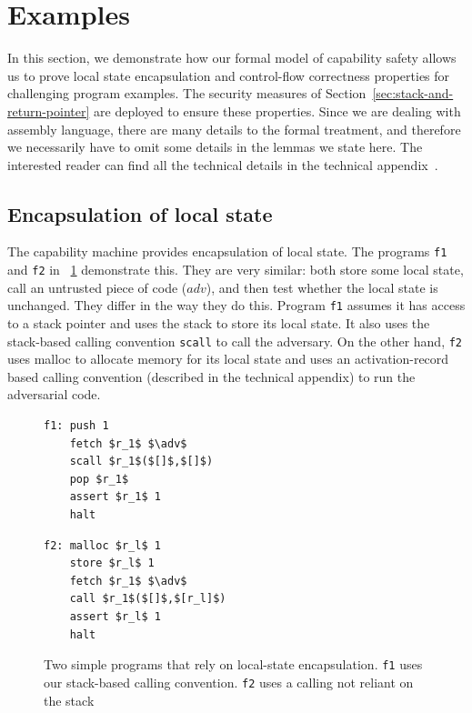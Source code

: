 \documentclass[compsoc,conference,letterpaper,fleqn]{IEEEtran}
\newcommand{\var}[1]{\mathit{#1}}
\newcommand{\adv}{\var{adv}}
\begin{document}
\section{Examples}
\label{sec:examples}
In this section, we demonstrate how our formal model of capability
safety allows us to prove local state encapsulation and control-flow
correctness properties for challenging program examples. The security
measures of Section~\ref{sec:stack-and-return-pointer} are deployed to
ensure these properties. Since we are dealing with assembly language,
there are many details to the formal treatment, and therefore we
necessarily have to omit some details in the lemmas we state here.
The interested reader can find all the technical details in the
technical appendix~\cite{technical_appendix}.

\subsection{Encapsulation of local state}
The capability machine provides encapsulation of local state. The programs
\texttt{\footnotesize{f1}} and \texttt{\footnotesize{f2}} in
\figurename~\ref{fig:prog-f1-and-f2} demonstrate this. They are very similar: both
store some local state, call an untrusted piece of code ($\adv$), and then test
whether the local state is unchanged. They differ in the way they do this.
Program \texttt{\footnotesize{f1}} assumes it has access to a stack pointer and uses the stack
to store its local state. It also uses the stack-based calling convention
\texttt{\footnotesize{scall}} to call the adversary. On the other hand, \texttt{\footnotesize{f2}} uses
malloc to allocate memory for its local state and uses an activation-record
based calling convention (described in the technical appendix) to run the
adversarial code.

\begin{figure}[t]
  \centering

  \begin{minipage}[t]{4.1cm}
  \begin{lstlisting}
f1: push 1
    fetch $r_1$ $\adv$
    scall $r_1$($[]$,$[]$)
    pop $r_1$
    assert $r_1$ 1
    halt
  \end{lstlisting}
  \end{minipage}
  \begin{minipage}[t]{4.1cm}
  \begin{lstlisting}
f2: malloc $r_l$ 1
    store $r_l$ 1
    fetch $r_1$ $\adv$
    call $r_1$($[]$,$[r_l]$)
    assert $r_l$ 1
    halt
  \end{lstlisting}
  \end{minipage}
  \caption{Two simple programs that rely on local-state encapsulation. \texttt{f1} uses our stack-based calling convention. \texttt{f2} uses a calling not reliant on the stack}
  \label{fig:prog-f1-and-f2}
\end{figure}
\end{document}
